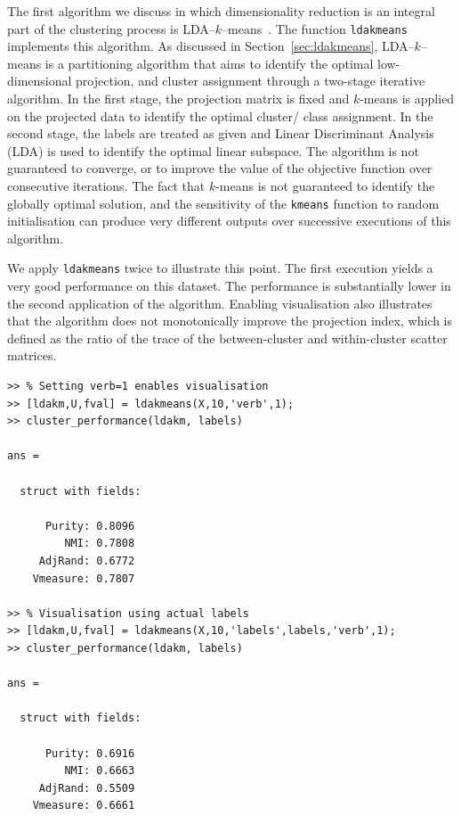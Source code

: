 \documentclass{book}
\begin{document}
The first algorithm we discuss in which dimensionality reduction is an
integral part of the clustering process is LDA--$k$--means~\cite{DingL2007}.
%
The function {\tt ldakmeans} implements this algorithm.
%
As discussed in Section~\ref{sec:ldakmeans}, LDA--$k$--means is a 
partitioning algorithm that aims to identify the optimal low-dimensional
projection, and cluster assignment through a two-stage
iterative algorithm. In the first stage, the projection matrix is fixed and
$k$-means is applied on the projected data to identify the optimal
cluster/ class assignment. In the second stage, the labels are treated as given
and Linear Discriminant Analysis (LDA) is used to identify the optimal linear
subspace.
%
The algorithm is not guaranteed to converge, or to improve the value of the
objective function over consecutive iterations. The fact that
$k$-means is not guaranteed to identify the globally optimal
solution, and the sensitivity of the 
{\tt kmeans} function to random initialisation can produce very different
outputs over successive executions of this algorithm.

We apply {\tt ldakmeans} twice to illustrate this point. The first execution yields a very good
performance on this dataset. The performance is substantially lower
in the second application of the algorithm. Enabling visualisation also
illustrates that the algorithm does not monotonically improve the
projection index, which is defined as the
ratio of the trace of the between-cluster and within-cluster scatter matrices.
%

\begin{verbatim}
>> % Setting verb=1 enables visualisation
>> [ldakm,U,fval] = ldakmeans(X,10,'verb',1);
>> cluster_performance(ldakm, labels)

ans = 

  struct with fields:

      Purity: 0.8096
         NMI: 0.7808
     AdjRand: 0.6772
    Vmeasure: 0.7807

>> % Visualisation using actual labels
>> [ldakm,U,fval] = ldakmeans(X,10,'labels',labels,'verb',1);
>> cluster_performance(ldakm, labels)

ans = 

  struct with fields:

      Purity: 0.6916
         NMI: 0.6663
     AdjRand: 0.5509
    Vmeasure: 0.6661

\end{verbatim}
\end{document}
